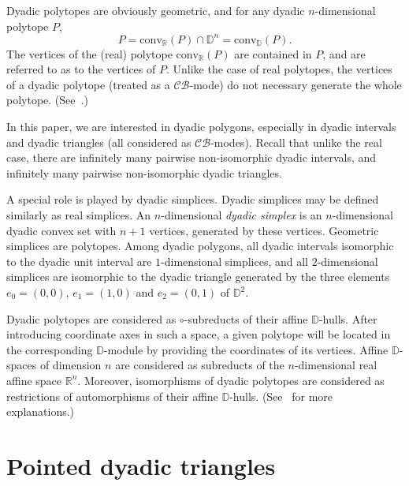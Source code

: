 \documentclass[12pt]{amsart}
\def\mr{\mathrm}
\def\mbR{\mathbb{R}}
\def\mbD{\mathbb{D}}
\theoremstyle{plain}
\theoremstyle{definition}
\numberwithin{equation}{section}
\begin{document}
Dyadic polytopes are obviously geometric, and for any dyadic $n$-dimen\-sional polytope $P$,
\begin{equation}\label{E:pol}
P = \mr{conv}_{\mbR}(P) \cap \mbD^n = \mr{conv}_{\mbD}(P).
\end{equation}
The vertices of the (real) polytope $\mr{conv}_{\mbR}(P)$ are contained in $P$, and are referred to as to the vertices of $P$. Unlike the case of real polytopes, the vertices of a dyadic polytope   (treated as a $\mathcal{CB}$-mode)  do not necessary generate the whole polytope. (See~\cite{MMR23}.)

In this paper, we are interested in dyadic polygons, especially in dyadic intervals and dyadic triangles (all considered as $\mathcal{CB}$-modes). Recall that unlike the real case, there are infinitely many pairwise non-isomorphic dyadic intervals, and infinitely many pairwise non-isomorphic dyadic triangles.

A special role is played by dyadic simplices. Dyadic simplices may be defined similarly as real simplices. An $n$-dimensional \emph{dyadic simplex} is an $n$-dimensional dyadic convex set with $n+1$ vertices, generated by these vertices. Geometric simplices are polytopes. Among dyadic polygons, all dyadic intervals isomorphic to the dyadic unit interval are $1$-dimensional simplices, and all $2$-dimensional simplices are isomorphic to the dyadic triangle generated by the three elements $e_0 = (0,0)$, $e_1 = (1,0)$ and $e_2 = (0,1)$ of $\mbD^2$.


Dyadic polytopes are considered as  $\circ$-subreducts  of their affine $\mbD$-hulls. After introducing coordinate axes in such a space, a given polytope will be located in the corresponding $\mbD$-module by providing the coordinates of its vertices. Affine $\mbD$-spaces of dimension $n$ are considered as subreducts of the $n$-dimensional real affine space $\mbR^n$. Moreover, isomorphisms of dyadic polytopes are considered as restrictions of automorphisms of their affine $\mbD$-hulls. (See~\cite{MMR23} for more explanations.)




\section{Pointed dyadic triangles}\label{S:Triangles}
\end{document}
